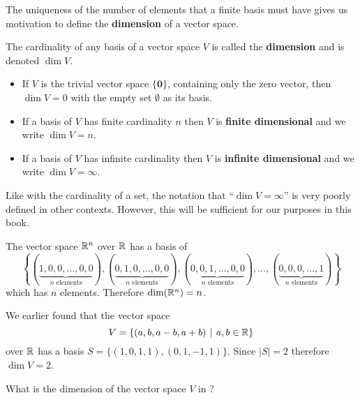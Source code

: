 The uniqueness of the number of elements that a finite basis must have gives us motivation to define the \textbf{dimension} of a vector space.

\begin{definition}
    The cardinality of any basis of a vector space $V$ is called the \textbf{dimension} and is denoted $\dim{V}$.
    \begin{itemize}
        \item If $V$ is the trivial vector space $\{\textbf{0}\}$, containing only the zero vector, then $\dim{V} = 0$ with the empty set $\emptyset$ as its basis.
        \item If a basis of $V$ has finite cardinality $n$ then $V$ is \textbf{finite dimensional} and we write $\dim{V} = n$.
        \item If a basis of $V$ has infinite cardinality then $V$ is \textbf{infinite dimensional} and we write $\dim{V} = \infty$.
    \end{itemize}
\end{definition}
\begin{remark}
    Like with the cardinality of a set, the notation that ``$\dim{V} = \infty$'' is very poorly defined in other contexts. However, this will be sufficient for our purposes in this book.
\end{remark}

\begin{example}
    The vector space $\mathbb{R}^n$ over $\mathbb{R}$ has a basis of
    \[
        \left\{(\underbrace{1, 0, 0, \dots, 0, 0}_{n \text{ elements}}), (\underbrace{0, 1, 0, \dots, 0, 0}_{n \text{ elements}}), (\underbrace{0, 0, 1, \dots, 0, 0}_{n \text{ elements}}), \dots, (\underbrace{0, 0, 0, \dots, 1}_{n \text{ elements}})\right\}
    \]
    which has $n$ elements. Therefore $\dim{\R^n} = n$.
\end{example}

\begin{example}
    We earlier found that the vector space
    \[
        V = \{(a, b, a-b, a+b) \vert a, b \in \R\}
    \]
    over $\mathbb{R}$ has a basis $S = \{(1, 0, 1, 1), (0, 1, -1, 1)\}$. Since $|S| = 2$ therefore $\dim{V} = 2$.
\end{example}

\begin{exercise}
    What is the dimension of the vector space $V$ in ?
\end{exercise}

